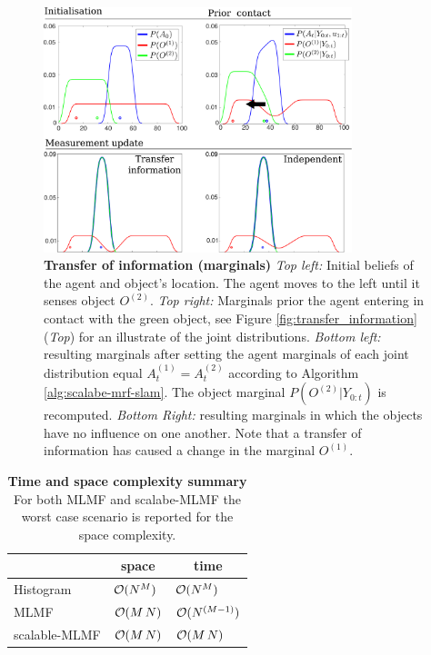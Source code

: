 \begin{figure}
  \centering
  \includegraphics[width=0.8\textwidth]{./ch5-MLMF/Figures/Figure11_v3.pdf}
  \caption{\textbf{Transfer of information (marginals)} \textit{Top left:} Initial beliefs of the agent and object's location. The agent moves to the left until it senses object $O^{(2)}$.
  \textit{Top right:} Marginals prior the agent entering in contact with the green object, see Figure \ref{fig:transfer_information} (\textit{Top}) for an illustrate of the joint distributions.
  \textit{Bottom left:} resulting marginals after setting the agent marginals of each 
  joint distribution equal $A^{(1)}_t = A^{(2)}_t$ according to Algorithm \ref{alg:scalabe-mrf-slam}. The object marginal $P(O^{(2)}|Y_{0:t})$ is recomputed. 
  \textit{Bottom Right:} resulting marginals in which the objects have no influence on one another.
  Note that a transfer of information has caused a change in the marginal $O^{(1)}$.}
  \label{fig:independence_object}
\end{figure}

\begin{table}
 \centering
 \begin{tabular}{c|c|c|}
\cline{2-3}
				        &    \textbf{space}   &     \textbf{time} \\ \hline
    \multicolumn{1}{|l}{Histogram}      & \multicolumn{1}{|l}{$\operatorname{\mathcal{O}}(N^M)$}   &  \multicolumn{1}{|l|}{$\operatorname{\mathcal{O}}(N^M)$}      \\ \hline
    \multicolumn{1}{|l}{MLMF}           & \multicolumn{1}{|l}{$\operatorname{\mathcal{O}}(M\,N)$}  &  \multicolumn{1}{|l|}{$\operatorname{\mathcal{O}}(N^{(M-1)})$} \\ \hline
    \multicolumn{1}{|l}{scalable-MLMF}  & \multicolumn{1}{|l}{$\operatorname{\mathcal{O}}(M\,N)$}  &  \multicolumn{1}{|l|}{$\operatorname{\mathcal{O}}(M\,N)$}     \\ \hline
   \end{tabular}
   \caption{\textbf{Time and space complexity summary} For both MLMF and scalabe-MLMF the worst case scenario is reported for the space complexity.}
   \label{tab:time_space_summary}
\end{table}

